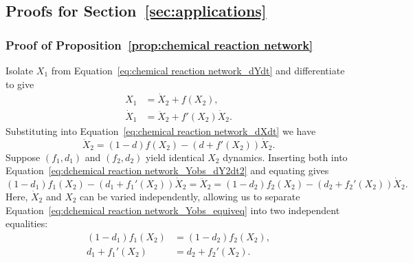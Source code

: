 \documentclass{article}
\theoremstyle{plain}
\theoremstyle{definition}
\begin{document}
{%

\subsection{Proofs for Section~\ref{sec:applications}} \label{appendix:proofs_section5}

\subsubsection{Proof of Proposition~\ref{prop:chemical reaction network}} \label{appendix:proof_chemical reaction network}

Isolate $X_1$ from Equation~\eqref{eq:chemical reaction network_dYdt} and differentiate to give
\begin{align*}
    X_1       &= \dot{X}_2 + f(X_2), \\
    \dot{X}_1 &= \ddot{X}_2 + f'(X_2)\dot{X}_2.
\end{align*}
Substituting into Equation~\eqref{eq:chemical reaction network_dXdt} we have
\begin{equation}
    \label{eq:dchemical reaction network_Yobs_dY2dt2}
    \ddot{X}_2 = (1-d)f(X_2) - (d + f'(X_2))\dot{X}_2.
\end{equation}
Suppose $(f_1,d_1)$ and $(f_2,d_2)$ yield identical $X_2$ dynamics. Inserting both into Equation~\eqref{eq:dchemical reaction network_Yobs_dY2dt2} and equating gives
\begin{equation}
    \label{eq:dchemical reaction network_Yobs_equiveq}
    (1-d_1)f_1(X_2) - (d_1 + f_1'(X_2))\dot{X}_2 = \ddot{X}_2 = (1-d_2)f_2(X_2) - (d_2 + f_2'(X_2))\dot{X}_2.
\end{equation}
Here, $\dot{X}_2$ and $X_2$ can be varied independently, allowing us to separate Equation~\eqref{eq:dchemical reaction network_Yobs_equiveq} into two independent equalities:
\begin{align}
    (1-d_1)f_1(X_2) &= (1-d_2)f_2(X_2), \label{eq:dchemical reaction network_Yobs_dalg_1} \\
    d_1 + f_1'(X_2) &= d_2 + f_2'(X_2). \label{eq:dchemical reaction network_Yobs_dalg_2}
\end{align}

}
\end{document}
